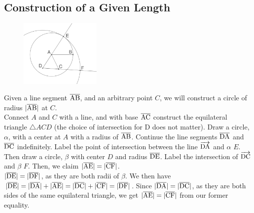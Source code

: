 \documentclass{report}
\begin{document}
\subsection{Construction of a Given Length}
\begin{figure} %
    \centering
    \includegraphics[width=0.35\textwidth]{fav}
\end{figure}
Given a line segment $\overline{\rm AB}$, and an arbitrary point $C$, we will construct a circle of radius $|\overline{\rm AB}|$ at $C$.
\\[\baselineskip]
Connect $A$ and $C$ with a line, and with base $\overline{\rm AC}$ construct the equilateral triangle $\triangle{ACD}$ (the choice of intersection for D does not matter). Draw a circle, $\alpha$, with a center at $A$ with a radius of $\overline{\rm AB}$. Continue the line segments $\overline{\rm DA}$ and $\overline{\rm DC}$ indefinitely. Label the point of intersection between the line $\overrightarrow{\rm DA}$ and $\alpha$ $E$. Then draw a circle, $\beta$ with center $D$ and radius $\overline{\rm DE}$. Label the intersection of $\overrightarrow{\rm DC}$ and $\beta$ $F$. Then, we claim $|\overline{\rm AE}| = |\overline{\rm CF}|$.
\\$|\overline{\rm DE}|=|\overline{\rm DF}|$, as they are both radii of $\beta$. We then have $|\overline{\rm DE}|=|\overline{\rm DA}|+|\overline{\rm AE}|=|\overline{\rm DC}|+|\overline{\rm CF}|=|\overline{\rm DF}|$. Since $|\overline{\rm DA}|=|\overline{\rm DC}|$, as they are both sides of the same equilateral triangle, we get $|\overline{\rm AE}| = |\overline{\rm CF}|$ from our former equality.
\end{document}

